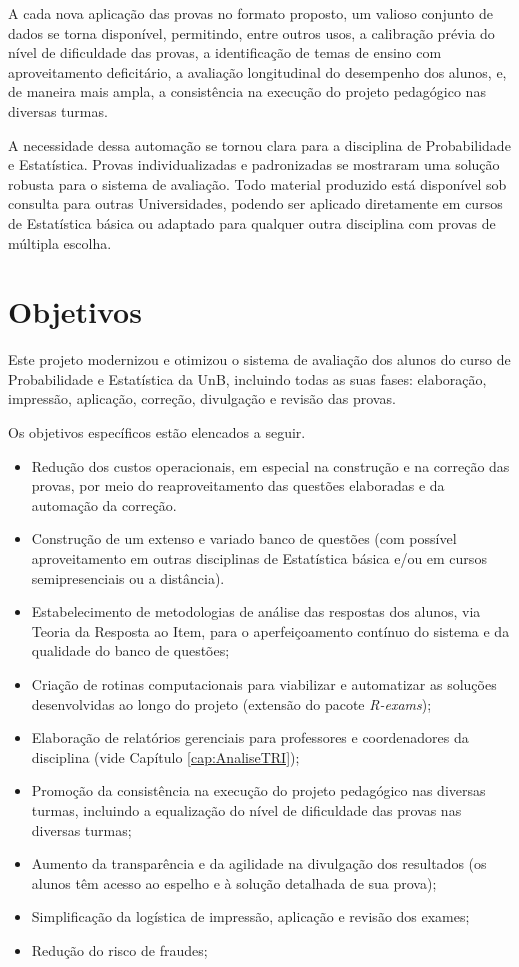 \documentclass[a4paper]{report}
\providecommand{\tightlist}{%
  \setlength{\itemsep}{0pt}\setlength{\parskip}{0pt}}
\begin{document}
A cada nova aplicação das provas no formato proposto, um valioso
conjunto de dados se torna disponível, permitindo, entre outros usos, a
calibração prévia do nível de dificuldade das provas, a identificação de
temas de ensino com aproveitamento deficitário, a avaliação longitudinal
do desempenho dos alunos, e, de maneira mais ampla, a consistência na
execução do projeto pedagógico nas diversas turmas.

A necessidade dessa automação se tornou clara para a disciplina de
Probabilidade e Estatística. Provas individualizadas e padronizadas se
mostraram uma solução robusta para o sistema de avaliação. Todo material
produzido está disponível sob consulta para outras Universidades,
podendo ser aplicado diretamente em cursos de Estatística básica ou
adaptado para qualquer outra disciplina com provas de múltipla escolha.

\section{Objetivos}

Este projeto modernizou e otimizou o sistema de avaliação dos alunos do
curso de Probabilidade e Estatística da UnB, incluindo todas as suas
fases: elaboração, impressão, aplicação, correção, divulgação e revisão
das provas.

Os objetivos específicos estão elencados a seguir.

\begin{itemize}
\tightlist
\item
  Redução dos custos operacionais, em especial na construção e na
  correção das provas, por meio do reaproveitamento das questões
  elaboradas e da automação da correção.
\item
  Construção de um extenso e variado banco de questões (com possível
  aproveitamento em outras disciplinas de Estatística básica e/ou em
  cursos semipresenciais ou a distância).
\item
  Estabelecimento de metodologias de análise das respostas dos alunos,
  via Teoria da Resposta ao Item, para o aperfeiçoamento contínuo do
  sistema e da qualidade do banco de questões;
\item
  Criação de rotinas computacionais para viabilizar e automatizar as
  soluções desenvolvidas ao longo do projeto (extensão do pacote
  \emph{R-exams});
\item
  Elaboração de relatórios gerenciais para professores e coordenadores
  da disciplina (vide Capítulo \ref{cap:AnaliseTRI});
\item
  Promoção da consistência na execução do projeto pedagógico nas
  diversas turmas, incluindo a equalização do nível de dificuldade das
  provas nas diversas turmas;
\item
  Aumento da transparência e da agilidade na divulgação dos resultados
  (os alunos têm acesso ao espelho e à solução detalhada de sua prova);
\item
  Simplificação da logística de impressão, aplicação e revisão dos
  exames;
\item
  Redução do risco de fraudes;
\end{itemize}
\end{document}

